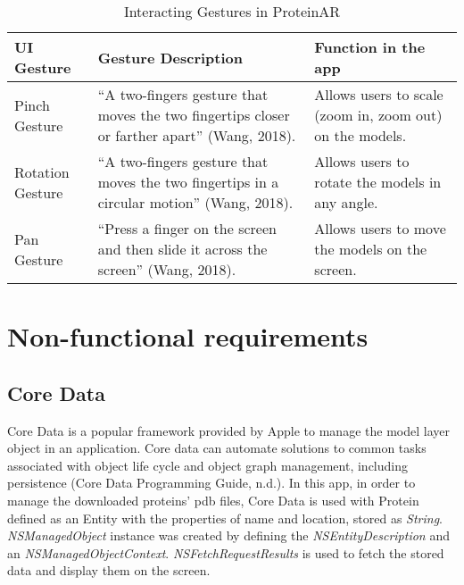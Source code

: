 \begin{table}[h!]
\centering
\begin{tabularx}{\textwidth} {
  | >{\raggedright\arraybackslash}X 
  | >{\raggedright\arraybackslash}X 
  | >{\raggedright\arraybackslash}X | }
\hline
UI Gesture & Gesture Description & Function in the app \\
\hline
\hline
Pinch Gesture & “A two-fingers gesture that moves the two fingertips closer or farther apart” (Wang, 2018). & Allows users to scale (zoom in, zoom out) on the models. \\
\hline
Rotation Gesture & “A two-fingers gesture that moves the two fingertips in a circular motion” (Wang, 2018). & Allows users to rotate the models in any angle. \\
\hline
Pan Gesture & “Press a finger on the screen and then slide it across the screen” (Wang, 2018). & Allows users to move the models on the screen. \\
\hline
\end{tabularx}
\caption {Interacting Gestures in ProteinAR}
\label{tab:gesture}
\end{table}



\section{Non-functional requirements}
\subsection{Core Data}
Core Data is a popular framework provided by Apple to manage the model layer object in an application. Core data can automate solutions to common tasks associated with object life cycle and object graph management, including persistence (Core Data Programming Guide, n.d.). In this app, in order to manage the downloaded proteins’ pdb files, Core Data is used with Protein defined as an Entity with the properties of name and location, stored as \emph{String}. \emph{NSManagedObject} instance was created by defining the \emph{NSEntityDescription} and an \emph{NSManagedObjectContext}. \emph{NSFetchRequestResults} is used to fetch the stored data and display them on the screen. 

